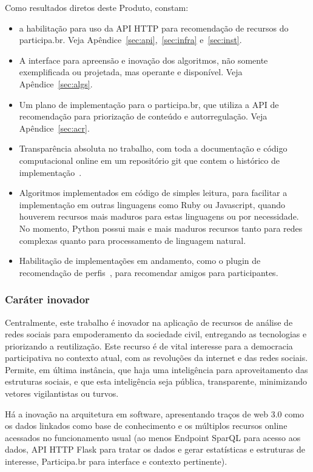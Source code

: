 \documentclass[12pt]{article}
\begin{document}
Como resultados diretos deste Produto, constam:
\begin{itemize}
    \item a habilitação para uso da API HTTP para recomendação de recursos do participa.br. Veja Apêndice~\ref{sec:api},~\ref{sec:infra} e~\ref{sec:inst}.
    \item A interface para apreensão e inovação dos algoritmos, não somente exemplificada ou projetada, mas operante e disponível. Veja Apêndice~\ref{sec:algs}.
    \item Um plano de implementação para o participa.br, que utiliza a API de recomendação para priorização de conteúdo e autorregulação. Veja Apêndice~\ref{sec:acr}.
    \item Transparência absoluta no trabalho, com toda a documentação e código computacional online em um repositório git que contem o histórico de implementação~\cite{repoProd4}.
    \item Algoritmos implementados em código de simples leitura, para facilitar a implementação em outras linguagens como Ruby ou Javascript, quando houverem recursos mais maduros para estas linguagens ou por necessidade. No momento, Python possui mais e mais maduros recursos tanto para redes complexas quanto para processamento de linguagem natural.
    \item Habilitação de implementações em andamento, como o plugin de recomendação de perfis~\cite{actionItem}, para recomendar amigos para participantes. 
\end{itemize}
\subsubsection{Caráter inovador}
Centralmente, este trabalho é inovador na aplicação de recursos de análise de redes sociais para empoderamento da sociedade civil, entregando as tecnologias e priorizando a reutilização. Este recurso é de vital interesse para a democracia participativa no contexto atual, com as revoluções da internet e das redes sociais. Permite, em última instância, que haja uma inteligência para aproveitamento das estruturas sociais, e que esta inteligência seja pública, transparente, minimizando vetores vigilantistas ou turvos.

Há a inovação na arquitetura em software, apresentando traços de web 3.0 como os dados linkados como base de conhecimento e os múltiplos recursos online acessados no funcionamento usual (ao menos Endpoint SparQL para acesso aos dados, API HTTP Flask para tratar os dados e gerar estatísticas e estruturas de interesse, Participa.br para interface e contexto pertinente).
\end{document}

